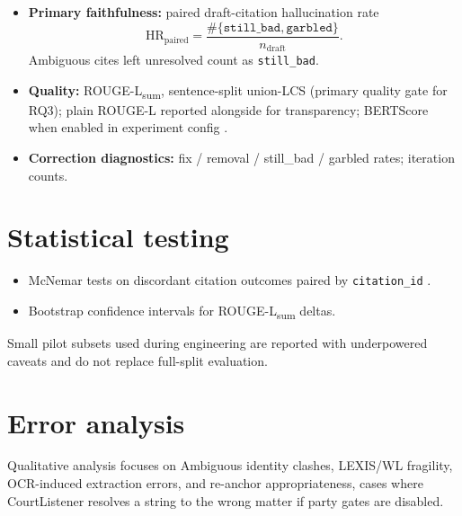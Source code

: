 \begin{itemize}
  \item \textbf{Primary faithfulness:} paired draft-citation hallucination rate
  \[
  \mathrm{HR}_{\mathrm{paired}} = \frac{\#\{\texttt{still\_bad},\texttt{garbled}\}}{n_{\mathrm{draft}}}.
  \]
  Ambiguous cites left unresolved count as \texttt{still\_bad}.
  \item \textbf{Quality:} ROUGE-L\textsubscript{sum}, sentence-split union-LCS (primary quality gate for RQ3); plain ROUGE-L reported alongside for transparency; BERTScore when enabled in experiment config \cite{lin2004rouge,zhang2020bertscore}.
  \item \textbf{Correction diagnostics:} fix / removal / still\_bad / garbled rates; iteration counts.
\end{itemize}

\section{Statistical testing}

\begin{itemize}
  \item McNemar tests on discordant citation outcomes paired by \texttt{citation\_id} \cite{mcnemar1947}.
  \item Bootstrap confidence intervals for ROUGE-L\textsubscript{sum} deltas.
\end{itemize}
Small pilot subsets used during engineering are reported with underpowered caveats and do not replace full-split evaluation.

\section{Error analysis}

Qualitative analysis focuses on Ambiguous identity clashes, LEXIS/WL fragility, OCR-induced extraction errors, and re-anchor appropriateness, cases where CourtListener resolves a string to the wrong matter if party gates are disabled.
